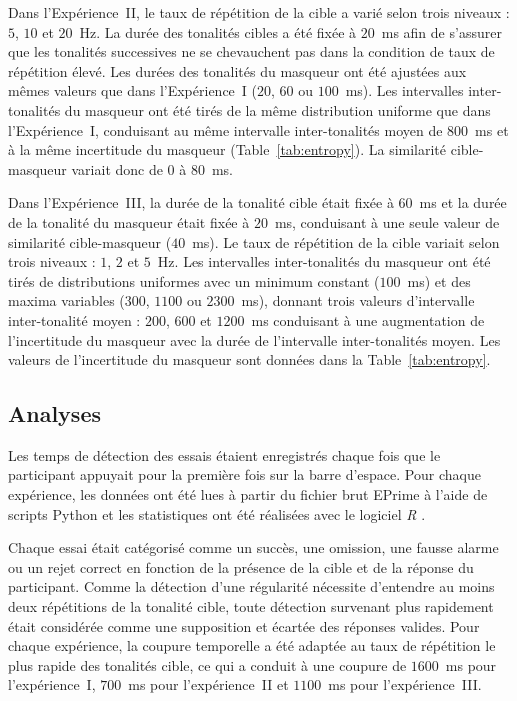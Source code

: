 Dans l'Expérience~II, le taux de répétition de la cible a varié selon trois niveaux : $5$, $10$ et $20$~Hz. 
La durée des tonalités cibles a été fixée à $20$~ms afin de s'assurer que les tonalités successives ne se chevauchent pas dans la condition de taux de répétition élevé. 
Les durées des tonalités du masqueur ont été ajustées aux mêmes valeurs que dans l'Expérience~I ($20$, $60$ ou $100$~ms). 
Les intervalles inter-tonalités du masqueur ont été tirés de la même distribution uniforme que dans l'Expérience~I, conduisant au même intervalle inter-tonalités moyen de $800$~ms et à la même incertitude du masqueur (Table~\ref{tab:entropy}). 
La similarité cible-masqueur variait donc de $0$ à $80$~ms.

Dans l'Expérience~III, la durée de la tonalité cible était fixée à $60$~ms et la durée de la tonalité du masqueur était fixée à $20$~ms, conduisant à une seule valeur de similarité cible-masqueur ($40$~ms). 
Le taux de répétition de la cible variait selon trois niveaux : $1$, $2$ et $5$~Hz. 
Les intervalles inter-tonalités du masqueur ont été tirés de distributions uniformes avec un minimum constant ($100$~ms) et des maxima variables ($300$, $1100$ ou $2300$~ms), donnant trois valeurs d'intervalle inter-tonalité moyen : $200$, $600$ et $1200$~ms conduisant à une augmentation de l'incertitude du masqueur avec la durée de l'intervalle inter-tonalités moyen. 
Les valeurs de l'incertitude du masqueur sont données dans la Table~\ref{tab:entropy}.  

\subsection{Analyses}
\label{chapitre4analyses}

Les temps de détection des essais étaient enregistrés chaque fois que le participant appuyait pour la première fois sur la barre d'espace. 
Pour chaque expérience, les données ont été lues à partir du fichier brut EPrime à l'aide de scripts Python \citep{van2007python} et les statistiques ont été réalisées avec le logiciel \textit{R} \citep{Rlanguage2017}. 

Chaque essai était catégorisé comme un succès, une omission, une fausse alarme ou un rejet correct en fonction de la présence de la cible et de la réponse du participant. 
Comme la détection d'une régularité nécessite d'entendre au moins deux répétitions de la tonalité cible, toute détection survenant plus rapidement était considérée comme une supposition et écartée des réponses valides. 
Pour chaque expérience, la coupure temporelle a été adaptée au taux de répétition le plus rapide des tonalités cible, ce qui a conduit à une coupure de $1600$~ms pour l'expérience~I, $700$~ms pour l'expérience~II et $1100$~ms pour l'expérience~III.

